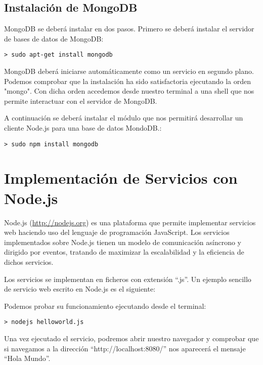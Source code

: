 \documentclass[12pt, a4paper, spanish]{scrartcl}
\begin{document}
\subsection{Instalación de MongoDB}
\label{install-mongodb}

MongoDB se deberá instalar en dos pasos. Primero se deberá instalar el servidor de bases de datos de MongoDB:

\begin{lstlisting}
> sudo apt-get install mongodb
\end{lstlisting}

MongoDB deberá iniciarse automáticamente como un servicio en segundo plano. Podemos comprobar que la instalación ha sido satisfactoria ejecutando la orden "mongo". Con dicha orden accedemos desde nuestro terminal a una shell que nos permite interactuar con el servidor de MongoDB.

A continuación se deberá instalar el módulo que nos permitirá desarrollar un cliente Node.js para una base de datos MondoDB.:

\begin{lstlisting}
> sudo npm install mongodb
\end{lstlisting}

\section{Implementación de Servicios con Node.js}

Node.js (\url{http://nodejs.org}) es una plataforma que permite implementar servicios web haciendo uso del lenguaje de programación JavaScript. Los servicios implementados sobre Node.js tienen un modelo de comunicación asíncrono y dirigido por eventos, tratando de maximizar la escalabilidad y la eficiencia de dichos servicios.

Los servicios se implementan en ficheros con extensión ``.js''. Un ejemplo sencillo de servicio web escrito en Node.js es el siguiente:



Podemos probar su funcionamiento ejecutando desde el terminal:

\begin{lstlisting}
> nodejs helloworld.js
\end{lstlisting}

Una vez ejecutado el servicio, podremos abrir nuestro navegador y comprobar que si navegamos a la dirección ``http://localhost:8080/'' nos aparecerá el mensaje ``Hola Mundo''.
\end{document}
